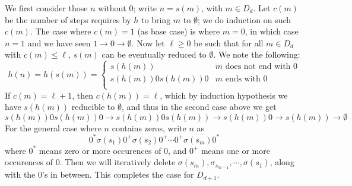 \documentclass[11pt,a4paper]{article}
\begin{document}
\begin{enumerate}
        We first consider those $n$ without 0; write $n = s(m)$, with $m\in D_d$. 
        Let $c(m)$ be the number of steps requires by $h$ to bring $m$ to $\emptyset$; we do induction on such $c(m)$. 
        The case where $c(m)=1$ (as base case) is where $m = 0$, in which case $n=1$ and we have seen $1\to 0\to \emptyset$. 
        Now let $\ell\ge 0$ be such that for all $m\in D_d$ with $c(m)\le \ell$, 
        $s(m)$ can be eventually reduced to $\emptyset$. 
        We note the following: 
        \[
        h(n) = h(s(m)) = 
        \begin{cases}
        	s(h(m)) & \text{$m$ does not end with 0}\\
        	s(h(m))0s(h(m))0 & \text{$m$ ends with 0}\\
        \end{cases}
        \]
        If $c(m)=\ell+1$, then $c(h(m))=\ell$, which by induction hypothesis we have $s(h(m))$ reducible to $\emptyset$, 
        and thus in the second case above we get 
        \[
        s(h(m))0s(h(m))0 \to s(h(m))0 s(h(m))\to s(h(m))0 \to s(h(m))\to\emptyset
        \]
        For the general case where $n$ contains zeros, write $n$ as 
        \[
        0^*\sigma(s_1)0^+\sigma(s_2)0^+\cdots 0^+\sigma(s_m) 0^*
        \]
        where $0^*$ means zero or more occurences of 0, and $0^+$ means one or more occurences of 0.
        Then we will iteratively delete $\sigma(s_m), \sigma_{s_{m-1}}, \cdots, \sigma(s_1)$, along with the 0's in between. 
        This completes the case for $D_{d+1}$. 
    \end{enumerate}
    
\end{document}
